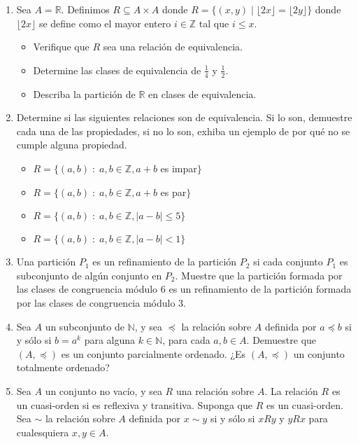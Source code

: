 \documentclass[letterpaper,11pt]{article}
\begin{document}
\begin{enumerate}
    \item Sea $A = ℝ$. Definimos $R ⊆ A × A$ donde $R = \{(x, y) \; | \; 
    ⌊2x⌋ = ⌊2y⌋\}$ donde $⌊2x⌋$ se define como el mayor entero $i \in ℤ$ tal que 
    $i \leq x$.
    \begin{itemize}
        \item Verifique que $R$ sea una relación de equivalencia.
        \item Determine las clases de equivalencia de $\frac{1}{4}$ y 
        $\frac{1}{2}$.
        \item Describa la partición de $ℝ$ en clases de equivalencia.
    \end{itemize}

    \item Determine si las siguientes relaciones son de equivalencia. Si lo son,
    demuestre cada una de las propiedades, si no lo son, exhiba un ejemplo de  
    por qué no se cumple alguna propiedad.
    \begin{itemize}
        \item $R = \{(a,b) \; : \; a,b \in ℤ, a+b$ es impar$\}$
        \item $R = \{(a,b) \; : \; a,b \in ℤ, a+b$ es par$\}$
        \item $R = \{(a,b) \; : \; a,b \in ℤ, |a-b| \leq 5\}$
        \item $R = \{(a,b) \; : \; a, b \in ℤ, |a-b| < 1\}$
    \end{itemize}

    \item Una partición $P_{1}$ es un refinamiento de la partición $P_{2}$ si 
    cada conjunto $P_{1}$ es subconjunto de algún conjunto en $P_{2}$. Muestre 
    que la partición formada por las clases de congruencia módulo $6$ es un 
    refinamiento de la partición formada por las clases de congruencia módulo 
    $3$.

    \item Sea $A$ un subconjunto de $ℕ$, y sea $\preceq$ la relación sobre $A$
    definida por $a \preceq b$ si y sólo si $b = a^{k}$ para alguna $k \in ℕ$,
    para cada $a,b \in A$. Demuestre que $(A, \preceq)$ es un conjunto 
    parcialmente ordenado. ¿Es $(A, \preceq)$ un conjunto totalmente ordenado?

    \item Sea $A$ un conjunto no vacío, y sea $R$ una relación sobre $A$. La 
    relación $R$ es un cuasi-orden si es reflexiva y transitiva. Suponga que 
    $R$ es un cuasi-orden. Sea $\sim$ la relación sobre $A$ definida por 
    $x \sim y$ si y sólo si $xRy$ y $yRx$ para cualesquiera $x, y \in A$.


\end{enumerate}
\end{document}
